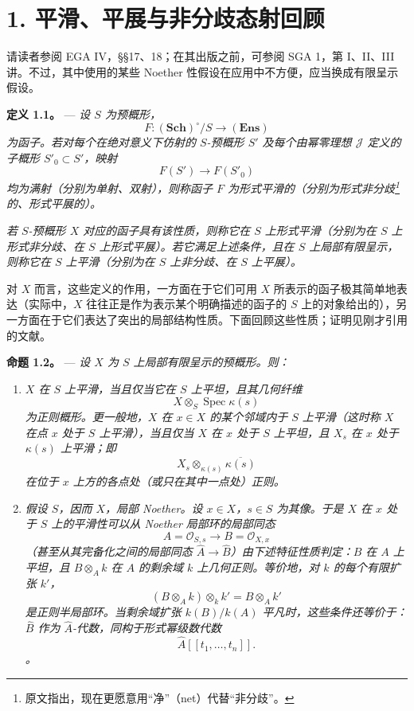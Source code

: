 \section*{1. 平滑、平展与非分歧态射回顾}

请读者参阅 EGA IV，§§17、18；在其出版之前，可参阅 SGA 1，第 I、II、III 讲。不过，其中使用的某些 Noether 性假设在应用中不方便，应当换成有限呈示假设。

\medskip\noindent{}\textbf{定义 1.1。} --- \textit{设 \(S\) 为预概形，\[
  F:(\mathbf{Sch})^\circ/S\longrightarrow(\mathbf{Ens})
\] 为函子。若对每个在绝对意义下仿射的 \(S\)-预概形 \(S'\) 及每个由幂零理想 \(\mathscr J\) 定义的子概形 \(S'_0\subset S'\)，映射 \[
  F(S')\longrightarrow F(S'_0)
\] 均为满射（分别为单射、双射），则称函子 \(F\) 为\emph{形式平滑}的（分别为\emph{形式非分歧}\footnote{原文指出，现在更愿意用“净”（net）代替“非分歧”。}的、\emph{形式平展}的）。}

\textit{若 \(S\)-预概形 \(X\) 对应的函子具有该性质，则称它在 \(S\) 上形式平滑（分别为在 \(S\) 上形式非分歧、在 \(S\) 上形式平展）。若它满足上述条件，且在 \(S\) 上局部有限呈示，则称它在 \(S\) 上平滑（分别为在 \(S\) 上非分歧、在 \(S\) 上平展）。}

对 \(X\) 而言，这些定义的作用，一方面在于它们可用 \(X\) 所表示的函子极其简单地表达（实际中，\(X\) 往往正是作为表示某个明确描述的函子的 \(S\) 上的对象给出的），另一方面在于它们表达了突出的局部结构性质。下面回顾这些性质；证明见刚才引用的文献。

\medskip\noindent{}\textbf{命题 1.2。} --- \textit{设 \(X\) 为 \(S\) 上局部有限呈示的预概形。则：}

\begin{enumerate}\item[(i)]\textit{\(X\) 在 \(S\) 上平滑，当且仅当它在 \(S\) 上平坦，且其几何纤维 \[
  X\otimes_S\operatorname{Spec}\kappa(s)
\] 为正则概形。更一般地，\(X\) 在 \(x\in X\) 的某个邻域内于 \(S\) 上平滑（这时称 \(X\) 在点 \(x\) 处于 \(S\) 上平滑），当且仅当 \(X\) 在 \(x\) 处于 \(S\) 上平坦，且 \(X_s\) 在 \(x\) 处于 \(\kappa(s)\) 上平滑；即 \[
  X_s\otimes_{\kappa(s)}\overline{\kappa(s)}
\] 在位于 \(x\) 上方的各点处（或只在其中一点处）正则。}

\item[(ii)]\textit{假设 \(S\)，因而 \(X\)，局部 Noether。设 \(x\in X\)，\(s\in S\) 为其像。于是 \(X\) 在 \(x\) 处于 \(S\) 上的平滑性可以从 Noether 局部环的局部同态 \[
  A=\mathscr O_{S,s}\longrightarrow B=\mathscr O_{X,x}
\]（甚至从其完备化之间的局部同态 \(\widehat A\to\widehat B\)）由下述特征性质判定：\(B\) 在 \(A\) 上平坦，且 \(B\otimes_A k\) 在 \(A\) 的剩余域 \(k\) 上几何正则。等价地，对 \(k\) 的每个有限扩张 \(k'\)，\[
  (B\otimes_A k)\otimes_k k'=B\otimes_A k'
\] 是正则半局部环。当剩余域扩张 \(k(B)/k(A)\) 平凡时，这些条件还等价于：\(\widehat B\) 作为 \(\widehat A\)-代数，同构于形式幂级数代数 \[
  \widehat A[[t_1,\ldots,t_n]].
\]。}\end{enumerate}

